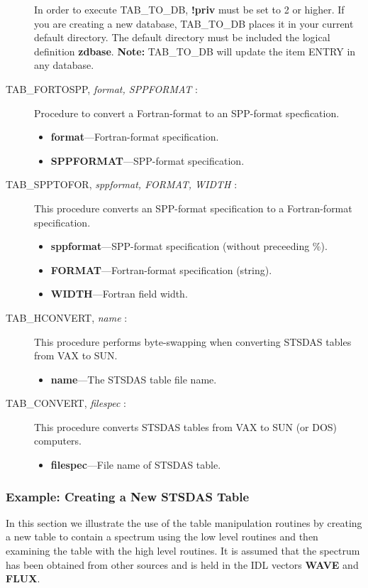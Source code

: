 \begin{description}
In order to execute TAB\_TO\_DB, {\bf !priv} must be set to 2 or 
higher.  If you are creating a new database, TAB\_TO\_DB places it in 
your current default directory.  The default directory must be 
included the logical definition {\bf zdbase}.  {\bf Note:}  
TAB\_TO\_DB will update the item ENTRY in any database.

\item [TAB\_FORTOSPP, {\it format, SPPFORMAT} :] Procedure to convert a 
Fortran-format to an SPP-format specfication.
\begin{itemize}
\item {\bf format}---Fortran-format specification.
\item {\bf SPPFORMAT}---SPP-format specification.
\end{itemize}
%
\item [TAB\_SPPTOFOR, {\it sppformat, FORMAT, WIDTH} :] This procedure 
converts an SPP-format specification to a Fortran-format specification.
\begin{itemize}
\item {\bf sppformat}---SPP-format specification (without preceeding \%).
\item {\bf FORMAT}---Fortran-format specification (string).
\item {\bf WIDTH}---Fortran field width.
\end{itemize}
%
\item [TAB\_HCONVERT, {\it name} :] This procedure performs byte-swapping 
when converting STSDAS tables from VAX to SUN.
\begin{itemize}
\item {\bf name}---The STSDAS table file name.
\end{itemize}
%
\item [TAB\_CONVERT, {\it filespec} :] This procedure converts STSDAS tables from VAX to 
SUN (or DOS) computers.
\begin{itemize}
\item {\bf filespec}---File name of STSDAS table.
\end{itemize}
\end{description}
\newpage
\subsubsection{\bf Example: Creating a New STSDAS Table}

In this 
section we illustrate the use of the table manipulation routines
by creating a new table to contain a spectrum using the low level
routines and then examining the table with the high level routines. 
It is assumed that the spectrum has been obtained from other sources and is 
held in the IDL vectors {\bf WAVE} and {\bf FLUX}.\\

